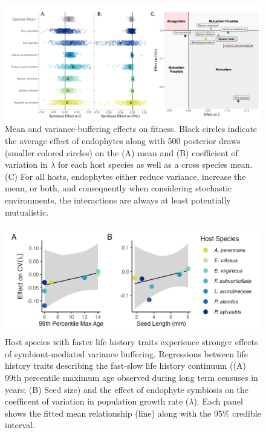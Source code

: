 \documentclass[9pt,twocolumn,twoside]{pnas-new}
\begin{document}
\begin{figure}
	\centering
	\includegraphics[width =\linewidth]{StochDemo_fig2.png}
	\caption{Mean and variance-buffering effects on fitness. Black circles indicate the average effect of endophytes along with 500 posterior draws (smaller colored circles) on the (A) mean and (B) coefficient of variation in $\lambda$ for each host species as well as a cross species mean. (C) For all hosts, endophytes either reduce variance, increase the mean, or both, and consequently when considering stochastic environments, the interactions are always at least potentially mutualistic.}
\end{figure}

\begin{figure}
	\centering
	\includegraphics[width=.8\linewidth]{StochDemo_fig3.png}
	\caption{Host species with faster life history traits experience stronger effects of symbiont-mediated variance buffering. Regressions between life history traits describing the fast-slow life history continuum ((A) 99th percentile maximum age observed during long term censuses in years; (B) Seed size) and the effect of endophyte symbiosis on the coefficent of variation in population growth rate ($\lambda$). Each panel shows the fitted mean relationship (line) along with the 95\% credible interval.}
\end{figure}
\end{document}

